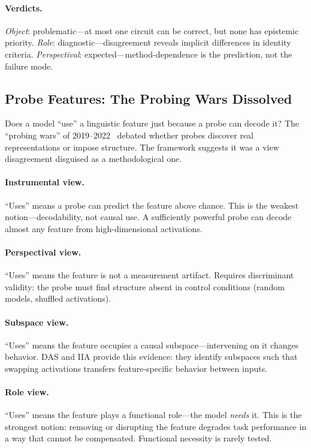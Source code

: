 \documentclass{article}
\begin{document}
\paragraph{Verdicts.}
\emph{Object}: problematic---at most one circuit can be correct, but
none has epistemic priority.
\emph{Role}: diagnostic---disagreement reveals implicit differences in
identity criteria.
\emph{Perspectival}: expected---method-dependence is the prediction, not
the failure mode.


\subsection{Probe Features: The Probing Wars Dissolved}\label{app:cs_probe}

Does a model ``use'' a linguistic feature just because a probe can decode
it? The ``probing wars'' of 2019--2022~\citep{hewitt2019, belinkov2022}
debated whether probes discover real representations or impose structure.
The framework suggests it was a view disagreement disguised as a
methodological one.

\paragraph{Instrumental view.}
``Uses'' means a probe can predict the feature above chance. This is the
weakest notion---decodability, not causal use. A sufficiently powerful
probe can decode almost any feature from high-dimensional activations.

\paragraph{Perspectival view.}
``Uses'' means the feature is not a measurement artifact. Requires
discriminant validity: the probe must find structure absent in control
conditions (random models, shuffled activations).

\paragraph{Subspace view.}
``Uses'' means the feature occupies a causal subspace---intervening on
it changes behavior. DAS and IIA provide this evidence: they identify
subspaces such that swapping activations transfers feature-specific
behavior between inputs.

\paragraph{Role view.}
``Uses'' means the feature plays a functional role---the model
\emph{needs} it. This is the strongest notion: removing or disrupting
the feature degrades task performance in a way that cannot be compensated.
Functional necessity is rarely tested.
\end{document}
